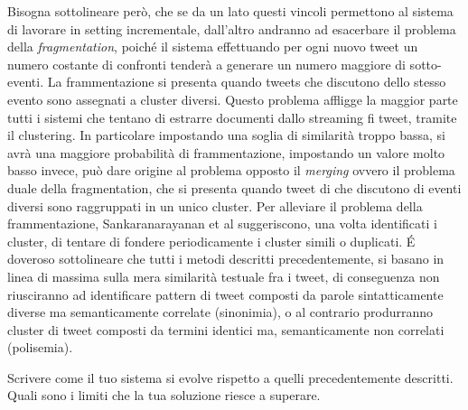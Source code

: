 Bisogna sottolineare però, che se da un lato questi vincoli permettono al sistema di lavorare in setting incrementale, dall'altro andranno ad esacerbare il problema della \emph{fragmentation}, poiché il sistema effettuando per ogni nuovo tweet un numero costante di confronti tenderà a generare un numero maggiore di sotto-eventi. La frammentazione si presenta quando tweets che discutono dello stesso evento sono assegnati a cluster diversi. Questo problema affligge la maggior parte tutti i sistemi che tentano di estrarre documenti dallo streaming fi tweet, tramite il clustering. In particolare impostando una soglia di similarità troppo bassa, si avrà una maggiore probabilità di frammentazione, impostando un valore molto basso invece, può dare origine al problema opposto il \emph{merging} ovvero il problema duale della fragmentation, che si presenta quando tweet di che discutono di eventi diversi sono raggruppati in un unico cluster. Per alleviare il problema della frammentazione, Sankaranarayanan et al \cite{Sankaranarayanan:2009:TNT:1653771.1653781} suggeriscono, una volta identificati i cluster, di tentare di fondere periodicamente i cluster simili o duplicati. \'E doveroso sottolineare che tutti i metodi descritti precedentemente, si basano in linea di massima   sulla mera similarità testuale fra i tweet,  di conseguenza non riusciranno ad identificare pattern di tweet composti da parole sintatticamente diverse ma  semanticamente correlate (sinonimia), o al contrario produrranno cluster di tweet composti da termini identici ma, semanticamente non correlati (polisemia).

\color{red}
Scrivere come il tuo sistema si evolve rispetto a quelli precedentemente descritti. Quali sono i limiti che la tua soluzione riesce a superare.


